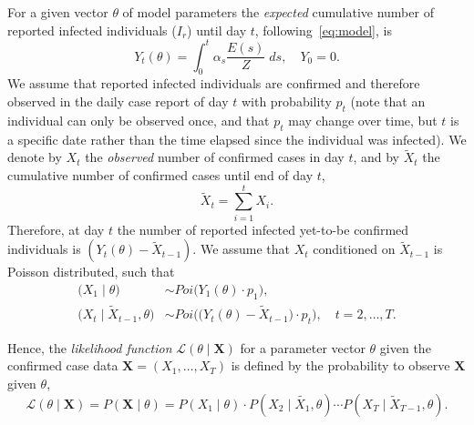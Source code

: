 \documentclass[12pt]{extarticle}
\let\vec\mathbf
\begin{document}
For a given vector $\theta$ of model parameters the \emph{expected} cumulative number of reported infected individuals ($I_r$) until day $t$, following~\autoref{eq:model}, is
\begin{equation} \label{eq:Yt}
Y_t(\theta) = \int_{0}^{t}{\alpha_s \frac{E(s)}{Z} \; ds}, \quad Y_0 = 0.
\end{equation}
We assume that reported infected individuals are confirmed and therefore observed in the daily case report of day $t$ with probability $p_t$ (note that an individual can only be observed once, and that $p_t$ may change over time, but $t$ is a specific date rather than the time elapsed since the individual was infected).
We denote by $X_t$ the \emph{observed} number of confirmed cases in day $t$, and by $\tilde{X}_t$ the cumulative number of confirmed cases until end of day $t$,
\begin{equation} \label{eq:Xsumt}
\tilde{X}_t=\sum_{i=1}^{t}X_i.
\end{equation}
Therefore, at day $t$ the number of reported infected yet-to-be confirmed individuals is
$(Y_t(\theta) - \tilde{X}_{t-1})$.
We assume that $X_t$ conditioned on $\tilde{X}_{t-1}$ is Poisson distributed, such that
\begin{equation} \label{eq:Xt} \begin{aligned}
\Big(X_1 \mid \theta \Big) & \sim \mathit{Poi}\big( Y_1(\theta) \cdot p_1 \big), \\
\Big(X_t \mid \tilde{X}_{t-1}, \theta \Big) & \sim 
\mathit{Poi}\Big( \big(Y_t(\theta) - \tilde{X}_{t-1}\big) \cdot p_t \Big), \quad t=2,\ldots,T.
\end{aligned}\end{equation}

Hence, the \emph{likelihood function} $\mathcal{L}(\theta \mid \vec{X})$ for a parameter vector $\theta$ given the confirmed case data $\vec{X} = (X_1, \ldots, X_T)$ is defined by the probability to observe  $\vec{X}$ given $\theta$,
\begin{equation} \label{eq:likelihood}
\mathcal{L}(\theta \mid \vec{X}) = 
P(\vec{X} \mid \theta) = 
P(X_1 \mid \theta) \cdot P(X_2 \mid \tilde{X_1}, \theta) \cdots P(X_T \mid \tilde{X}_{T-1}, \theta).
\end{equation}



\end{document}
